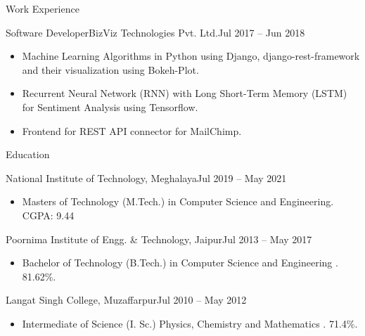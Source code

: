 \documentclass[]{shivshakti}
\begin{document}
	\makeheader
	
	\begin{cvsection}{Work Experience}
		\begin{cvsubsection}{Software Developer}{BizViz Technologies Pvt. Ltd.}{Jul 2017 -- Jun 2018}	
			\begin{itemize}
				\item Machine Learning Algorithms in Python using Django, django-rest-framework and their visualization using Bokeh-Plot.
				\item Recurrent Neural Network (RNN) with Long Short-Term Memory (LSTM) for Sentiment Analysis using Tensorflow.
				\item Frontend for REST API connector for MailChimp.
			\end{itemize}
		\end{cvsubsection}

	\end{cvsection}
	
	\begin{cvsection}{Education}
		\begin{newcvsubsection}{National Institute of Technology, Meghalaya}{Jul 2019 -- May 2021}
			\begin{itemize}
				\item
				Masters of Technology (M.Tech.) in Computer Science and Engineering. CGPA: 9.44
			\end{itemize}
		\end{newcvsubsection}
		
		\begin{newcvsubsection}{Poornima Institute of Engg. \& Technology, Jaipur}{Jul 2013 -- May 2017}
		    \begin{itemize}
		        \item Bachelor of Technology (B.Tech.) in Computer Science and Engineering . 81.62\%.
		    \end{itemize}
		\end{newcvsubsection}
		\begin{newcvsubsection}{Langat Singh College, Muzaffarpur}{Jul 2010 -- May 2012}
		    \begin{itemize}
		        \item Intermediate of Science (I. Sc.) Physics, Chemistry and Mathematics . 71.4\%.
		    \end{itemize}
		\end{newcvsubsection}
	\end{cvsection}
	
\end{document}
